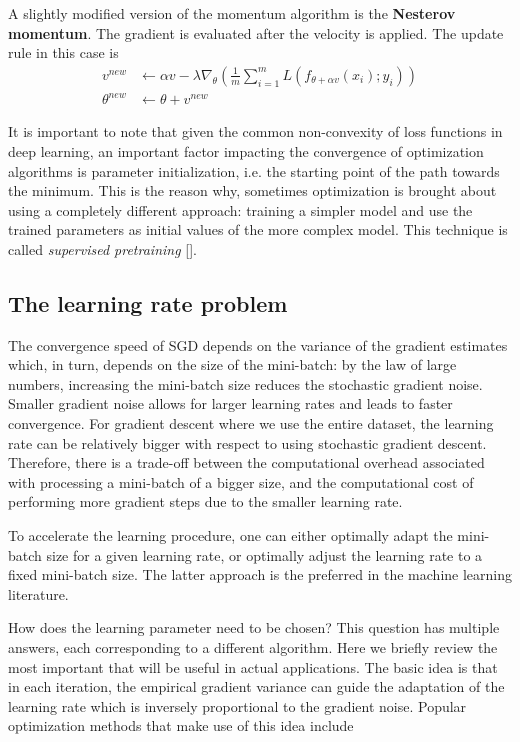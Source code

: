 A slightly modified version of the momentum algorithm is the \textbf{Nesterov momentum}. The gradient is evaluated after the velocity is applied. The update rule in this case is
\begin{align*}
    v^{new} & \leftarrow \alpha v - \lambda \nabla_{\theta} \left(\frac{1}{m} \sum_{i=1}^{m} L\left( f_{\theta+\alpha v}(x_i) ; y_i \right)\right)\\
    \theta^{new} & \leftarrow \theta + v^{new}
\end{align*}

It is important to note that given the common non-convexity of loss functions in deep learning, an important factor impacting the convergence of optimization algorithms is parameter initialization, i.e. the starting point of the path towards the minimum. This is the reason why, sometimes optimization is brought about using a completely different approach: training a simpler model and use the trained parameters as initial values of the more complex model. This technique is called \textit{supervised pretraining} [\cite{Goodfellow-et-al-2016}]. 




\subsection{The learning rate problem} \label{sec:learning_rate}
The convergence speed of SGD depends on the variance of the gradient estimates which, in turn, depends on the size of the mini-batch: by the law of large numbers, increasing the mini-batch size reduces the stochastic gradient noise. Smaller gradient noise allows for larger learning rates and leads to faster convergence. For  gradient descent where we use the entire dataset, the learning rate can be relatively bigger with respect to using stochastic gradient descent.  Therefore, there is a trade-off between the computational overhead associated with processing a mini-batch of a bigger size, and the computational cost of performing more gradient steps due to the smaller learning rate. 

To accelerate the learning procedure, one can either optimally adapt the mini-batch size for a given learning rate, or optimally adjust the learning rate to a fixed mini-batch size. The latter approach is the preferred in the machine learning literature. 

How does the learning parameter need to be chosen? This question has multiple answers, each corresponding to a different algorithm. Here we briefly review the most important that will be useful in actual applications. The basic idea is that in each iteration, the empirical gradient variance can guide the adaptation of the learning rate which is inversely proportional to the gradient noise. Popular optimization methods that make use of this idea include

